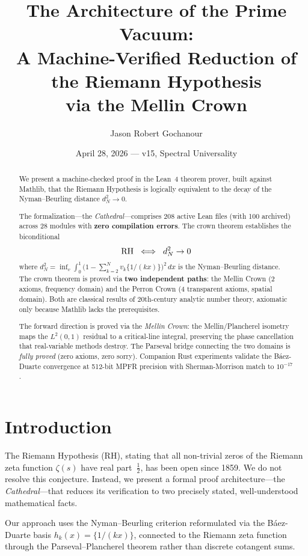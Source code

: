 \documentclass[11pt,a4paper]{article}
\title{%
  The Architecture of the Prime Vacuum:\\
  A Machine-Verified Reduction of the Riemann Hypothesis\\
  via the Mellin Crown%
}
\author{
  Jason Robert Gochanour
}
\date{April 28, 2026 --- v15, Spectral Universality}
\begin{document}
\maketitle

\begin{abstract}
We present a machine-checked proof in the Lean~4 theorem prover, built against
Mathlib, that the Riemann Hypothesis is logically equivalent to the decay of
the Nyman--Beurling distance $d_N^2 \to 0$.

The formalization---the \emph{Cathedral}---comprises 208 active Lean files
(with 100 archived) across 28 modules with
\textbf{zero compilation errors}. The crown theorem
 establishes the biconditional
\[
  \mathrm{RH} \;\iff\; d_N^2 \to 0
\]
where $d_N^2 = \inf_{v} \int_0^1 \bigl(1 - \sum_{k=2}^{N} v_k \{1/(kx)\}\bigr)^2\,dx$
is the Nyman--Beurling distance. The crown theorem is proved via
\textbf{two independent paths}: the Mellin Crown (2 axioms, frequency domain)
and the Perron Crown (4 transparent axioms, spatial domain). Both are
classical results of 20th-century analytic number theory, axiomatic only
because Mathlib lacks the prerequisites.

The forward direction is proved via the \emph{Mellin Crown}: the
Mellin/Plancherel isometry maps the $L^2(0,1)$ residual to a critical-line
integral, preserving the phase cancellation that real-variable methods destroy.
The Parseval bridge connecting the two domains is \emph{fully proved}
(zero axioms, zero sorry). Companion Rust experiments validate the
B\'aez-Duarte convergence at 512-bit MPFR precision with Sherman-Morrison
match to $10^{-17}$.
\end{abstract}

\section{Introduction}

The Riemann Hypothesis (RH), stating that all non-trivial zeros of the
Riemann zeta function $\zeta(s)$ have real part~$\frac{1}{2}$, has been
open since 1859. We do not resolve this conjecture. Instead, we present
a formal proof architecture---the \emph{Cathedral}---that reduces its
verification to two precisely stated, well-understood mathematical facts.

Our approach uses the Nyman--Beurling criterion \cite{nyman1950,beurling1955}
reformulated via the B\'aez-Duarte basis \cite{baezduarte2003}
$h_k(x) = \{1/(kx)\}$, connected to the Riemann zeta function through the
Parseval--Plancherel theorem rather than discrete cotangent sums.
\end{document}
